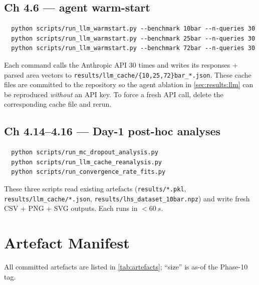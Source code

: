 \subsection{Ch 4.6 --- agent warm-start}
\begin{verbatim}
  python scripts/run_llm_warmstart.py --benchmark 10bar --n-queries 30
  python scripts/run_llm_warmstart.py --benchmark 25bar --n-queries 30
  python scripts/run_llm_warmstart.py --benchmark 72bar --n-queries 30
\end{verbatim}
Each command calls the Anthropic API 30 times and writes its
responses + parsed area vectors to
\texttt{results/llm\_cache/\{10,25,72\}bar\_*.json}. These
cache files are committed to the repository so the agent ablation
in \cref{sec:results:llm} can be reproduced
\emph{without} an API key. To force a fresh API call, delete the
corresponding cache file and rerun.

\subsection{Ch 4.14--4.16 --- Day-1 post-hoc analyses}
\begin{verbatim}
  python scripts/run_mc_dropout_analysis.py
  python scripts/run_llm_cache_reanalysis.py
  python scripts/run_convergence_rate_fits.py
\end{verbatim}
These three scripts read existing artefacts
(\texttt{results/*.pkl}, \texttt{results/llm\_cache/*.json},
\texttt{results/lhs\_dataset\_10bar.npz}) and write fresh CSV +
PNG + SVG outputs. Each runs in $< \SI{60}{s}$.

\section{Artefact Manifest}
\label{app:repro:artefacts}

All committed artefacts are listed in \cref{tab:artefacts};
``size'' is as-of the Phase-10 tag.

